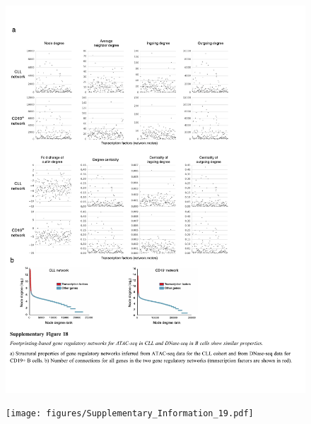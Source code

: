 \documentclass[10pt,]{article}
\begin{document}
\begin{figure}
\centering
\includegraphics[width=1.000\hsize]{figures/Supplementary_Information_18.pdf}
\end{figure}
\clearpage

\begin{figure}
\centering
\texttt{[image: figures/Supplementary\_Information\_19.pdf]}
\end{figure}
\clearpage
\end{document}
